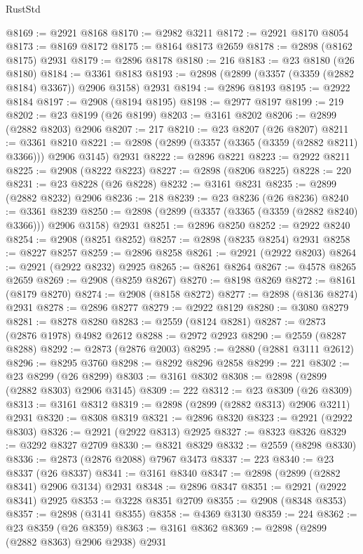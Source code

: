 \begin{lexlean}{RustStd}
\begin{coremodule}
@8169 := @2921 @8168
@8170 := @2982 @3211
@8172 := @2921 @8170 @8054
@8173 := @8169 @8172
@8175 := @8164 @8173 @2659
@8178 := @2898 (@8162 @8175) @2931
@8179 := @2896 @8178
@8180 := 216
@8183 := @23 @8180 (@26 @8180)
@8184 := @3361 @8183
@8193 := @2898 (@2899 (@3357 (@3359 (@2882 @8184) @3367)) @2906 @3158) @2931
@8194 := @2896 @8193
@8195 := @2922 @8184
@8197 := @2908 (@8194 @8195)
@8198 := @2977 @8197
@8199 := 219
@8202 := @23 @8199 (@26 @8199)
@8203 := @3161 @8202
@8206 := @2899 (@2882 @8203) @2906
@8207 := 217
@8210 := @23 @8207 (@26 @8207)
@8211 := @3361 @8210
@8221 := @2898 (@2899 (@3357 (@3365 (@3359 (@2882 @8211) @3366))) @2906 @3145) @2931
@8222 := @2896 @8221
@8223 := @2922 @8211
@8225 := @2908 (@8222 @8223)
@8227 := @2898 (@8206 @8225)
@8228 := 220
@8231 := @23 @8228 (@26 @8228)
@8232 := @3161 @8231
@8235 := @2899 (@2882 @8232) @2906
@8236 := 218
@8239 := @23 @8236 (@26 @8236)
@8240 := @3361 @8239
@8250 := @2898 (@2899 (@3357 (@3365 (@3359 (@2882 @8240) @3366))) @2906 @3158) @2931
@8251 := @2896 @8250
@8252 := @2922 @8240
@8254 := @2908 (@8251 @8252)
@8257 := @2898 (@8235 @8254) @2931
@8258 := @8227 @8257
@8259 := @2896 @8258
@8261 := @2921 (@2922 @8203)
@8264 := @2921 (@2922 @8232) @2925
@8265 := @8261 @8264
@8267 := @4578 @8265 @2659
@8269 := @2908 (@8259 @8267)
@8270 := @8198 @8269
@8272 := @8161 (@8179 @8270)
@8274 := @2908 (@8158 @8272)
@8277 := @2898 (@8136 @8274) @2931
@8278 := @2896 @8277
@8279 := @2922 @8129
@8280 := @3080 @8279
@8281 := @8278 @8280
@8283 := @2559 (@8124 @8281)
@8287 := @2873 (@2876 @1978) @4982 @2612
@8288 := @2972 @2923
@8290 := @2559 (@8287 @8288)
@8292 := @2873 (@2876 @2003)
@8295 := @2880 (@2881 @3111 @2612)
@8296 := @8295 @3760
@8298 := @8292 @8296 @2858
@8299 := 221
@8302 := @23 @8299 (@26 @8299)
@8303 := @3161 @8302
@8308 := @2898 (@2899 (@2882 @8303) @2906 @3145)
@8309 := 222
@8312 := @23 @8309 (@26 @8309)
@8313 := @3161 @8312
@8319 := @2898 (@2899 (@2882 @8313) @2906 @3211) @2931
@8320 := @8308 @8319
@8321 := @2896 @8320
@8323 := @2921 (@2922 @8303)
@8326 := @2921 (@2922 @8313) @2925
@8327 := @8323 @8326
@8329 := @3292 @8327 @2709
@8330 := @8321 @8329
@8332 := @2559 (@8298 @8330)
@8336 := @2873 (@2876 @2088) @7967 @3473
@8337 := 223
@8340 := @23 @8337 (@26 @8337)
@8341 := @3161 @8340
@8347 := @2898 (@2899 (@2882 @8341) @2906 @3134) @2931
@8348 := @2896 @8347
@8351 := @2921 (@2922 @8341) @2925
@8353 := @3228 @8351 @2709
@8355 := @2908 (@8348 @8353)
@8357 := @2898 (@3141 @8355)
@8358 := @4369 @3130
@8359 := 224
@8362 := @23 @8359 (@26 @8359)
@8363 := @3161 @8362
@8369 := @2898 (@2899 (@2882 @8363) @2906 @2938) @2931

\end{coremodule}
\end{lexlean}
